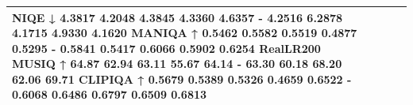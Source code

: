 \begin{tabular}{llll}
NIQE ↓ 4.3817 4.2048 4.3845 4.3360 4.6357 - 4.2516 6.2878 4.1715 4.9330 4.1620 MANIQA ↑ 0.5462 0.5582 0.5519 0.4877 0.5295 - 0.5841 0.5417 0.6066 0.5902 0.6254 RealLR200 MUSIQ ↑ 64.87 62.94 63.11 55.67 64.14 - 63.30 60.18 68.20 62.06 69.71 CLIPIQA ↑ 0.5679 0.5389 0.5326 0.4659 0.6522 - 0.6068 0.6486 0.6797 0.6509 0.6813 &  &  &  \\
\bottomrule
\end{tabular}
